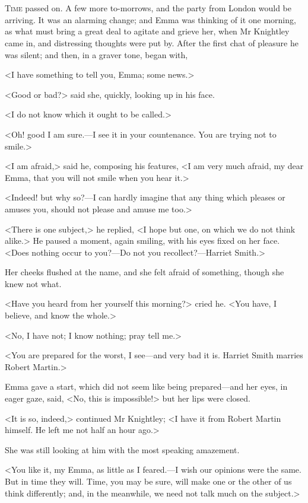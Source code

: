 \chapter[Chapter \thechapter]{}
\lettrine[lraise=0.3]{T}{ime} passed on. A few more to-morrows, and the party from London would be arriving. It was an alarming change; and Emma was thinking of it one morning, as what must bring a great deal to agitate and grieve her, when Mr Knightley came in, and distressing thoughts were put by. After the first chat of pleasure he was silent; and then, in a graver tone, began with,

<I have something to tell you, Emma; some news.>

<Good or bad?> said she, quickly, looking up in his face.

<I do not know which it ought to be called.>

<Oh! good I am sure.—I see it in your countenance. You are trying not to smile.>

<I am afraid,> said he, composing his features, <I am very much afraid, my dear Emma, that you will not smile when you hear it.>

<Indeed! but why so?—I can hardly imagine that any thing which pleases or amuses you, should not please and amuse me too.>

<There is one subject,> he replied, <I hope but one, on which we do not think alike.> He paused a moment, again smiling, with his eyes fixed on her face. <Does nothing occur to you?—Do not you recollect?—Harriet Smith.>

Her cheeks flushed at the name, and she felt afraid of something, though she knew not what.

<Have you heard from her yourself this morning?> cried he. <You have, I believe, and know the whole.>

<No, I have not; I know nothing; pray tell me.>

<You are prepared for the worst, I see—and very bad it is. Harriet Smith marries Robert Martin.>

Emma gave a start, which did not seem like being prepared—and her eyes, in eager gaze, said, <No, this is impossible!> but her lips were closed.

<It is so, indeed,> continued Mr Knightley; <I have it from Robert Martin himself. He left me not half an hour ago.>

She was still looking at him with the most speaking amazement.

<You like it, my Emma, as little as I feared.—I wish our opinions were the same. But in time they will. Time, you may be sure, will make one or the other of us think differently; and, in the meanwhile, we need not talk much on the subject.>

